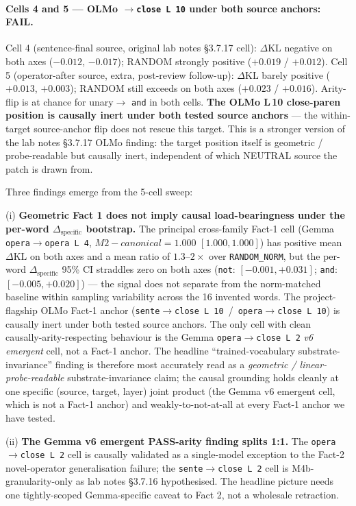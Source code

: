 \documentclass[11pt,letterpaper]{article}
\newcommand{\dkl}{\ensuremath{\Delta\mathrm{KL}}}
\newcommand{\dspec}{\ensuremath{\Delta_{\text{specific}}}}
\newcommand{\Mc}{M2-canonical}
\newcommand{\Mbfb}{M4b}
\begin{document}
\paragraph{Cells 4 and 5 --- OLMo \texttt{$\to$close L\,10} under
both source anchors: FAIL.} Cell 4 (sentence-final source, original
lab notes \S3.7.17 cell): \dkl{} negative on both axes ($-0.012$,
$-0.017$); RANDOM strongly positive ($+0.019$ / $+0.012$). Cell 5
(operator-after source, extra, post-review follow-up): \dkl{}
barely positive ($+0.013$, $+0.003$); RANDOM still exceeds on both
axes ($+0.023$ / $+0.016$). Arity-flip is at chance for unary$\to$
\texttt{and} in both cells. \textbf{The OLMo L\,10 close-paren
position is causally inert under both tested source anchors} ---
the within-target source-anchor flip does not rescue this target.
This is a stronger version of the lab notes \S3.7.17 OLMo finding:
the target position itself is geometric / probe-readable but
causally inert, independent of which NEUTRAL source the patch is
drawn from.

Three findings emerge from the 5-cell sweep:

(i) \textbf{Geometric Fact 1 does not imply causal load-bearingness
under the per-word \dspec{} bootstrap.} The principal cross-family
Fact-1 cell (Gemma \texttt{opera$\to$opera L\,4},
$\Mc = 1.000$ $[1.000, 1.000]$) has positive mean \dkl{} on both
axes and a mean ratio of $1.3$--$2\times$ over \texttt{RANDOM\_NORM},
but the per-word \dspec{} 95\% CI straddles zero on both axes
(\texttt{not}: $[-0.001, +0.031]$; \texttt{and}: $[-0.005, +0.020]$)
--- the signal does not separate from the norm-matched baseline
within sampling variability across the 16 invented words. The
project-flagship OLMo Fact-1 anchor
(\texttt{sente$\to$close L\,10}~/~\texttt{opera$\to$close L\,10}) is
causally inert under both tested source anchors. The only cell with
clean causally-arity-respecting behaviour is the Gemma
\texttt{opera$\to$close L\,2} \emph{v6 emergent} cell, not a Fact-1
anchor. The headline ``trained-vocabulary substrate-invariance''
finding is therefore most accurately read as a \emph{geometric /
linear-probe-readable} substrate-invariance claim; the causal
grounding holds cleanly at one specific (source, target, layer)
joint product (the Gemma v6 emergent cell, which is not a Fact-1
anchor) and weakly-to-not-at-all at every Fact-1 anchor we have
tested.

(ii) \textbf{The Gemma v6 emergent PASS-arity finding splits 1:1.}
The \texttt{opera$\to$close L\,2} cell is causally validated as a
single-model exception to the Fact-2 novel-operator generalisation
failure; the \texttt{sente$\to$close L\,2} cell is
\Mbfb{}-granularity-only as lab notes \S3.7.16 hypothesised. The
headline picture needs one tightly-scoped Gemma-specific caveat to
Fact 2, not a wholesale retraction.
\end{document}
